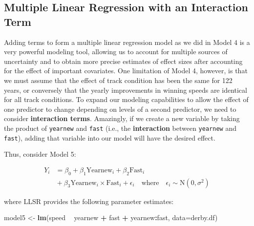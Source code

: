 \documentclass[
]{krantz}
\newenvironment{Shaded}{\begin{snugshade}}{\end{snugshade}}
\newcommand{\DataTypeTok}[1]{\textcolor[rgb]{0.27,0.27,0.27}{#1}}
\newcommand{\KeywordTok}[1]{\textcolor[rgb]{0.27,0.27,0.27}{\textbf{#1}}}
\newcommand{\NormalTok}[1]{#1}
\newcommand{\OperatorTok}[1]{\textcolor[rgb]{0.43,0.43,0.43}{\textbf{#1}}}
\newcommand{\StringTok}[1]{\textcolor[rgb]{0.5,0.5,0.5}{#1}}
\begin{document}
\hypertarget{multiple-linear-regression-with-an-interaction-term}{%
\subsection{Multiple Linear Regression with an Interaction Term}\label{multiple-linear-regression-with-an-interaction-term}}

Adding terms to form a multiple linear regression model as we did in Model 4 is a very powerful modeling tool, allowing us to account for multiple sources of uncertainty and to obtain more precise estimates of effect sizes after accounting for the effect of important covariates. One limitation of Model 4, however, is that we must assume that the effect of track condition has been the same for 122 years, or conversely that the yearly improvements in winning speeds are identical for all track conditions. To expand our modeling capabilities to allow the effect of one predictor to change depending on levels of a second predictor, we need to consider \textbf{interaction terms}.  Amazingly, if we create a new variable by taking the product of \texttt{yearnew} and \texttt{fast} (i.e., the \textbf{interaction} between \texttt{yearnew} and \texttt{fast}), adding that variable into our model will have the desired effect.

Thus, consider Model 5:

\begin{equation*}
\begin{split}
Y_{i}&= \beta_{0}+\beta_{1}\textrm{Yearnew}_{i}+\beta_{2}\textrm{Fast}_{i} \\
      &{}+\beta_{3}\textrm{Yearnew}_{i}\times\textrm{Fast}_{i}+\epsilon_{i}\quad \textrm{where}\quad \epsilon_{i}\sim \textrm{N}(0,\sigma^2)
\end{split}
\end{equation*}

where LLSR provides the following parameter estimates:

\begin{Shaded}
\begin{Highlighting}[]
\NormalTok{model5 <-}\StringTok{ }\KeywordTok{lm}\NormalTok{(speed }\OperatorTok{~}\StringTok{ }\NormalTok{yearnew }\OperatorTok{+}\StringTok{ }\NormalTok{fast }\OperatorTok{+}\StringTok{ }\NormalTok{yearnew}\OperatorTok{:}\NormalTok{fast, }
             \DataTypeTok{data=}\NormalTok{derby.df)}
\end{Highlighting}
\end{Shaded}
\end{document}
